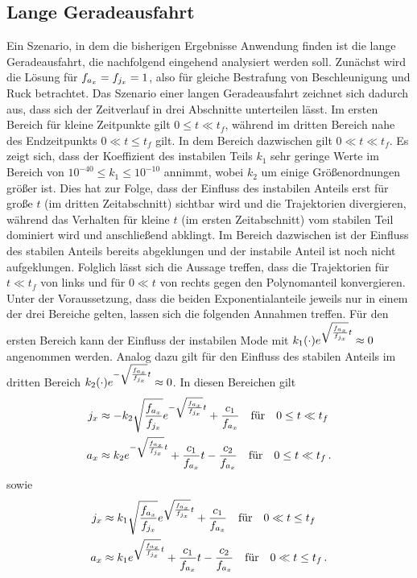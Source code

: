 \subsection{Lange Geradeausfahrt}
Ein Szenario, in dem die bisherigen Ergebnisse Anwendung finden ist die lange Geradeausfahrt, die nachfolgend eingehend analysiert werden soll. Zunächst wird die Lösung für $f_{a_x} = f_{j_x} = 1$, also für gleiche Bestrafung von Beschleunigung und Ruck betrachtet. Das Szenario einer langen Geradeausfahrt zeichnet sich dadurch aus, dass sich der Zeitverlauf in drei Abschnitte unterteilen lässt. Im ersten Bereich für kleine Zeitpunkte gilt $0\leq t\ll t_f$, während im dritten Bereich nahe des Endzeitpunkts $0\ll t\leq t_f$ gilt. In dem Bereich dazwischen gilt $0\ll t\ll t_f$. Es zeigt sich, dass der Koeffizient des instabilen Teils $k_1$ sehr geringe Werte im Bereich von $10^{-40}\leq k_1 \leq 10^{-10}$ annimmt, wobei $k_2$ um einige Größenordnungen größer ist. Dies hat zur Folge, dass der Einfluss des instabilen Anteils erst für große $t$ (im dritten Zeitabschnitt) sichtbar wird und die Trajektorien divergieren, während das Verhalten für kleine $t$ (im ersten Zeitabschnitt) vom stabilen Teil dominiert wird und anschließend abklingt. Im Bereich dazwischen ist der Einfluss des stabilen Anteils bereits abgeklungen und der instabile Anteil ist noch nicht aufgeklungen. Folglich lässt sich die Aussage treffen, dass die Trajektorien für $t\ll t_f$ von links und für $0\ll t$ von rechts gegen den Polynomanteil konvergieren. Unter der Voraussetzung, dass die beiden Exponentialanteile jeweils nur in einem der drei Bereiche gelten, lassen sich die folgenden Annahmen treffen. Für den ersten Bereich kann der Einfluss der instabilen Mode mit $k_1(\cdot)e^{\sqrt{\frac{f_{a_x}}{f_{j_x}}}t} \approx 0$ angenommen werden. Analog dazu gilt für den Einfluss des stabilen Anteils im dritten Bereich $k_2(\cdot)e^{-\sqrt{\frac{f_{a_x}}{f_{j_x}}}t} \approx 0$. In diesen Bereichen gilt 
\begin{align}
j_x &\approx -k_2\sqrt{\frac{f_{a_x}}{f_{j_x}}}e^{-\sqrt{\frac{f_{a_x}}{f_{j_x}}}t} + \frac{c_1}{f_{a_x}} \quad\textrm{für}\quad 0\leq t\ll t_f \label{eq:j_Bereich_1} \\
a_x &\approx k_2e^{-\sqrt{\frac{f_{a_x}}{f_{j_x}}}t} + \frac{c_1}{f_{a_x}}t - \frac{c_2}{f_{a_x}} \quad\textrm{für}\quad 0\leq t\ll t_f\,. \label{eq:a_Bereich_1}
\end{align}
sowie 
\begin{align}
j_x &\approx k_1\sqrt{\frac{f_{a_x}}{f_{j_x}}}e^{\sqrt{\frac{f_{a_x}}{f_{j_x}}}t} + \frac{c_1}{f_{a_x}} \quad\textrm{für}\quad 0\ll t\leq t_f \label{eq:j_Bereich_3} \\
a_x &\approx k_1e^{\sqrt{\frac{f_{a_x}}{f_{j_x}}}t} + \frac{c_1}{f_{a_x}}t - \frac{c_2}{f_{a_x}} \quad\textrm{für}\quad 0\ll t\leq t_f\,. \label{eq:a_Bereich_3}
\end{align}
